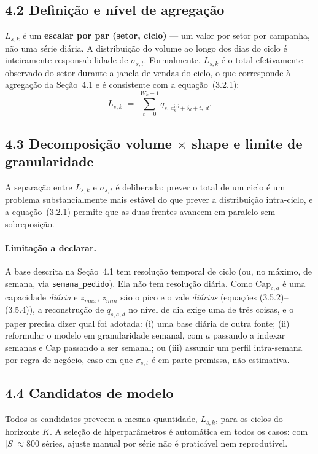 \documentclass[11pt]{article}
\begin{document}
\subsection*{4.2 Definição e nível de agregação}

$L_{s,k}$ é um \textbf{escalar por par (setor, ciclo)} --- um valor por
setor por campanha, não uma série diária. A distribuição do volume ao
longo dos dias do ciclo é inteiramente responsabilidade de
$\sigma_{s,t}$. Formalmente, $L_{s,k}$ é o total efetivamente observado
do setor durante a janela de vendas do ciclo, o que corresponde à
agregação da Seção~4.1 e é consistente com a equação~(3.2.1):
\[
L_{s,k} \;=\; \sum_{t=0}^{W_k-1} q_{s,\,a^{\mathrm{ini}}_k + \delta_d + t,\;d}.
\]

\subsection*{4.3 Decomposição volume $\times$ shape e limite de granularidade}

A separação entre $L_{s,k}$ e $\sigma_{s,t}$ é deliberada: prever o total
de um ciclo é um problema substancialmente mais estável do que prever a
distribuição intra-ciclo, e a equação~(3.2.1) permite que as duas frentes
avancem em paralelo sem sobreposição.

\paragraph{Limitação a declarar.} A base descrita na Seção~4.1 tem
resolução temporal de ciclo (ou, no máximo, de semana, via
\texttt{semana\_pedido}). Ela não tem resolução diária. Como
$\mathrm{Cap}_{c,a}$ é uma capacidade \emph{diária} e $z_{max}$, $z_{min}$
são o pico e o vale \emph{diários} (equações (3.5.2)--(3.5.4)), a
reconstrução de $q_{s,a,d}$ no nível de dia exige uma de três coisas, e o
paper precisa dizer qual foi adotada: (i) uma base diária de outra fonte;
(ii) reformular o modelo em granularidade semanal, com $a$ passando a
indexar semanas e $\mathrm{Cap}$ passando a ser semanal; ou (iii) assumir
um perfil intra-semana por regra de negócio, caso em que $\sigma_{s,t}$ é
em parte premissa, não estimativa.

\subsection*{4.4 Candidatos de modelo}

Todos os candidatos preveem a mesma quantidade, $L_{s,k}$, para os ciclos
do horizonte $K$. A seleção de hiperparâmetros é automática em todos os
casos: com $|S| \approx 800$ séries, ajuste manual por série não é
praticável nem reprodutível.
\end{document}
